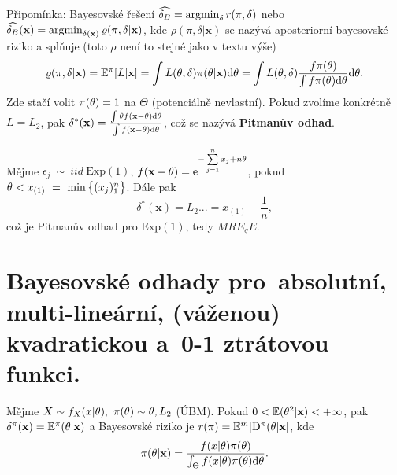 \begin{remark}
	Připomínka: Bayesovské řešení $\widehat{\delta_B}=\mathop{\mathrm{argmin}}_\delta r(\pi,\delta)$ nebo $\widehat{\delta_B}(\textbf{x})= \mathop{\mathrm{argmin}}_{\delta(\textbf{x})}\varrho(\pi,\delta|\textbf{x})$, kde $\rho(\pi,\delta|\textbf{x})$ se nazývá aposteriorní bayesovské riziko a splňuje (toto $\rho$ není to stejné jako v textu výše) 
	$$ \varrho(\pi,\delta|\textbf{x})=\mathbb{E}^\pi[L|\textbf{x}]=\int L(\theta,\delta)\pi(\theta|\textbf{x})\mathrm{d}\theta=\int L(\theta,\delta)\frac{f \pi(\theta)}{\int f \pi(\theta)\mathrm{d}\theta}\mathrm{d}\theta.$$
 Zde stačí volit $\pi(\theta)=1$ na $\Theta$ (potenciálně nevlastní). Pokud zvolíme konkrétně $L=L_2$, pak $\delta^\ast(\textbf{x})=\frac{\int\theta f(\textbf{x}-\theta)\mathrm{d}\theta}{\int f(\textbf{x}-\theta)\mathrm{d}\theta}$, což se nazývá \textbf{Pitmanův odhad}.
\end{remark}
\begin{example}
	Mějme $\epsilon_j~\sim~iid~\mathrm{Exp}(1)$, $f(\textbf{x}-\theta)=\mathrm{e}^{-\sum\limits_{j=1}^{n} x_j+n\theta}$, pokud $\theta< x_{(1)}~=~\min\big\{ (x_j)_1^n\big\}$. Dále pak
	$$ \delta^\ast(\textbf{x})\equal{L_2}...=x_{(1)}-\frac{1}{n},$$ což je Pitmanův odhad pro $\mathrm{Exp}(1)$, tedy $MRE_qE$.
\end{example}

\chapter{Bayesovské odhady pro~absolutní, multi-lineární, (váženou) kvadratickou a~0-1 ztrátovou funkci.}
\begin{theorem}\label{veta1}
	Mějme $X\sim f_{X}(x|\theta),~\pi(\theta)\sim \theta,L_2$ (ÚBM). Pokud $0<\mathbb{E}(\theta^2|\textbf{x})<+\infty$, pak $\delta^\pi(\textbf{x})=\mathbb{E}^\pi(\theta|\textbf{x})$ a Bayesovské riziko  je $r(\pi)=\mathbb{E}^m[\mathrm{D}^\pi(\theta|\textbf{x}]$, kde $$\pi(\theta|\textbf{x})=\frac{f(x|\theta)\pi(\theta)}{\int_\Theta f(x|\theta)\pi(\theta)\mathrm{d}\theta}.$$ 
\end{theorem}


